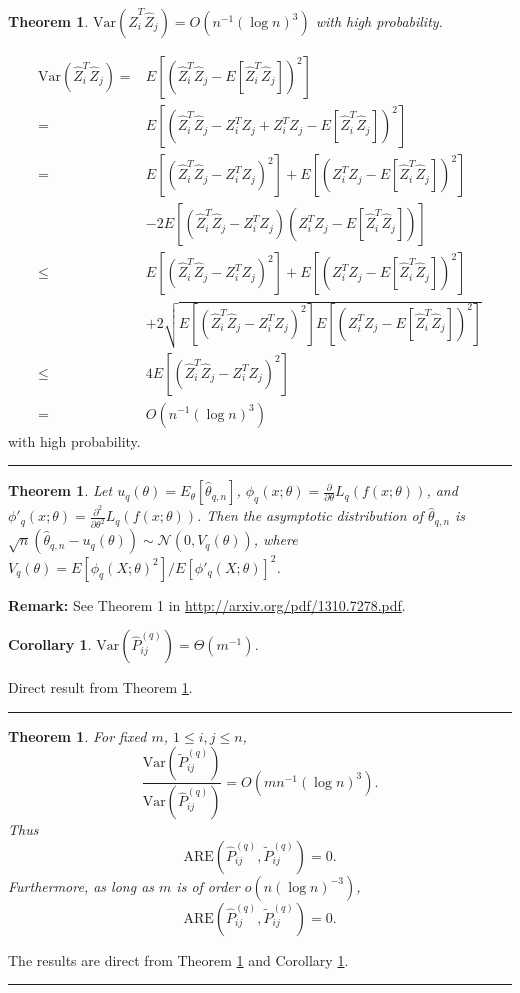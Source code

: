 \documentclass[a4paper]{article}
\newenvironment{proof}{{\bf Proof:  }}{\hfill\rule{2mm}{2mm}}
\newtheorem{theorem}[fact]{Theorem}
\newtheorem{corollary}[fact]{Corollary}
\begin{document}
\begin{theorem}
\label{thm:VarASELq}
$\mathrm{Var}(\hat{Z}_i^T \hat{Z}_j) = O(n^{-1} (\log n)^3)$ with high probability.
\end{theorem}
\begin{proof}
\begin{align*}
	\mathrm{Var}(\hat{Z}_i^T \hat{Z}_j)
    = & E[(\hat{Z}_i^T \hat{Z}_j - E[\hat{Z}_i^T \hat{Z}_j])^2] \\
    = & E[(\hat{Z}_i^T \hat{Z}_j - Z_i^T Z_j + Z_i^T Z_j - E[\hat{Z}_i^T \hat{Z}_j])^2] \\
    = & E[(\hat{Z}_i^T \hat{Z}_j - Z_i^T Z_j)^2] + E[(Z_i^T Z_j - E[\hat{Z}_i^T \hat{Z}_j])^2] \\ 
    & - 2E[(\hat{Z}_i^T \hat{Z}_j - Z_i^T Z_j)(Z_i^T Z_j - E[\hat{Z}_i^T \hat{Z}_j])] \\
    \le & E[(\hat{Z}_i^T \hat{Z}_j - Z_i^T Z_j)^2] + E[(Z_i^T Z_j - E[\hat{Z}_i^T \hat{Z}_j])^2] \\ 
    & + 2\sqrt{E[(\hat{Z}_i^T \hat{Z}_j - Z_i^T Z_j)^2] E[(Z_i^T Z_j - E[\hat{Z}_i^T \hat{Z}_j])^2]} \\
    \le & 4 E[(\hat{Z}_i^T \hat{Z}_j - Z_i^T Z_j)^2] \\
    = & O(n^{-1} (\log n)^3)
\end{align*}
with high probability.
\end{proof}


\begin{theorem}
\label{thm:VarLq}
Let $u_q(\theta) = E_{\theta}[\hat{\theta}_{q,n}]$, $\phi_q(x;\theta) = \frac{\partial}{\partial \theta}L_q(f(x;\theta))$, and $\phi'_q(x;\theta) = \frac{\partial^2}{\partial \theta^2}L_q(f(x;\theta))$. Then the asymptotic distribution of $\hat{\theta}_{q,n}$ is $\sqrt{n}(\hat{\theta}_{q,n} - u_q(\theta)) \sim \mathcal{N}(0, V_q(\theta))$, where $V_q(\theta) = E[\phi_q(X;\theta)^2]/E[\phi'_q(X;\theta)]^2$.
\end{theorem}
\textbf{Remark:} See Theorem 1 in \href{url}{http://arxiv.org/pdf/1310.7278.pdf}.

\begin{corollary}
\label{cor:VarLq}
$\mathrm{Var}(\hat{P}^{(q)}_{ij}) = \Theta(m^{-1})$.
\end{corollary}
\begin{proof}
Direct result from Theorem \ref{thm:VarLq}.
\end{proof}


\begin{theorem}
\label{thm:ARELq}
For fixed $m$, $1 \le i, j \le n$,
\[
	\frac{\mathrm{Var}(\widetilde{P}_{ij}^{(q)})}{\mathrm{Var}(\hat{P}_{ij}^{(q)})}
    = O(m n^{-1} (\log n)^3).
\]
Thus
\[
	\mathrm{ARE}(\hat{P}_{ij}^{(q)}, \widetilde{P}_{ij}^{(q)}) = 0.
\]
Furthermore, as long as $m$ is of order $o(n (\log n)^{-3})$,
\[
	\mathrm{ARE}(\hat{P}_{ij}^{(q)}, \widetilde{P}_{ij}^{(q)}) = 0.
\]
\end{theorem}
\begin{proof}
The results are direct from Theorem \ref{thm:VarASELq} and Corollary \ref{cor:VarLq}.
\end{proof}
\end{document}
